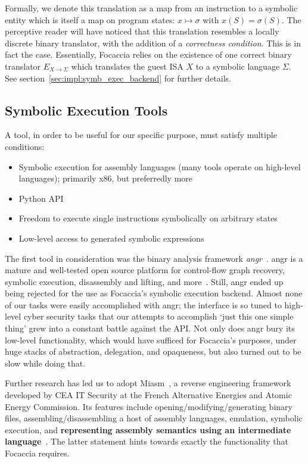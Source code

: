 Formally, we denote this translation as a map from an instruction to a symbolic entity which is itself a map on program
states: $x \mapsto \sigma$ with $x(S) = \sigma(S)$. The perceptive reader will have noticed that this translation
resembles a locally discrete binary translator, with the addition of a \textit{correctness condition}. This is in fact
the case. Essentially, Focaccia relies on the existence of one correct binary translator $E_{X \rightarrow \Sigma}$ which
translates the guest \ac{ISA} $X$ to a symbolic language $\Sigma$. See section~\ref{sec:impl:symb_exec_backend} for
further details.

\subsection{Symbolic Execution Tools}

A tool, in order to be useful for our specific purpose, must satisfy multiple conditions:

\begin{itemize}
    \item Symbolic execution for assembly languages (many tools operate on high-level languages); primarily x86, but
        preferredly more
    \item Python API
    \item Freedom to execute single instructions symbolically on arbitrary states
    \item Low-level access to generated symbolic expressions
\end{itemize}

The first tool in consideration was the binary analysis framework \textit{angr}~\cite{shoshitaishvili2016state}. angr is
a mature and well-tested open source platform for control-flow graph recovery, symbolic execution, disassembly and
lifting, and more~\cite{AngrWebsite2024Mar}. Still, angr ended up being rejected for the use as Focaccia's symbolic
execution backend. Almost none of our tasks were easily accomplished with angr; the interface is so tuned to high-level
cyber security tasks that our attempts to accomplish `just this one simple thing' grew into a constant battle against
the API\@. Not only does angr bury its low-level functionality, which would have sufficed for Focaccia's purposes, under
huge stacks of abstraction, delegation, and opaqueness, but also turned out to be slow while doing that.

Further research has led us to adopt Miasm~\cite{desclaux2012miasm}, a reverse engineering framework developed by CEA IT
Security at the French Alternative Energies and Atomic Energy Commission. Its features include
opening/modifying/generating binary files, assembling/disassembling a host of assembly languages, emulation, symbolic
execution, and \textbf{representing assembly semantics using an intermediate language}~\cite{cea-sec2024Mar}. The latter
statement hints towards exactly the functionality that Focaccia requires.

